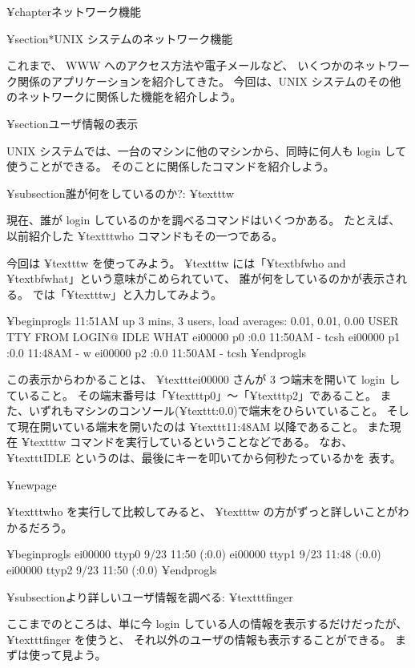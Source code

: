 ¥chapter{ネットワーク機能}

¥section*{UNIX システムのネットワーク機能}

これまで、 WWW へのアクセス方法や電子メールなど、
いくつかのネットワーク関係のアプリケーションを紹介してきた。
今回は、UNIX システムのその他のネットワークに関係した機能を紹介しよう。

¥section{ユーザ情報の表示}

 UNIX システムでは、一台のマシンに他のマシンから、同時に何人も login して
使うことができる。
そのことに関係したコマンドを紹介しよう。

¥subsection{誰が何をしているのか?: ¥texttt{w}}

現在、誰が login しているのかを調べるコマンドはいくつかある。
たとえば、以前紹介した ¥texttt{who} コマンドもその一つである。

今回は ¥texttt{w} を使ってみよう。
¥texttt{w} には「¥textbf{w}ho and ¥textbf{w}hat」という意味がこめられていて、
誰が何をしているのかが表示される。
では「¥texttt{w}」と入力してみよう。

¥begin{progls}
11:51AM  up 3 mins, 3 users, load averages: 0.01, 0.01, 0.00
USER             TTY      FROM              LOGIN@  IDLE WHAT
ei00000          p0       :0.0             11:50AM     - tcsh
ei00000          p1       :0.0             11:48AM     - w
ei00000          p2       :0.0             11:50AM     - tcsh
%
¥end{progls}

この表示からわかることは、 ¥texttt{ei00000} さんが 3 つ端末を開いて
login していること。
その端末番号は「¥texttt{p0}」〜「¥texttt{p2}」であること。
また、いずれもマシンのコンソール(¥texttt{:0.0})で端末をひらいていること。
そして現在開いている端末を開いたのは ¥texttt{11:48AM} 以降であること。
また現在 ¥texttt{w} コマンドを実行しているということなどである。
なお、 ¥texttt{IDLE} というのは、最後にキーを叩いてから何秒たっているかを
表す。

¥newpage

¥texttt{who} を実行して比較してみると、
¥texttt{w} の方がずっと詳しいことがわかるだろう。

¥begin{progls}
ei00000          ttyp0     9/23 11:50   (:0.0)
ei00000          ttyp1     9/23 11:48   (:0.0)
ei00000          ttyp2     9/23 11:50   (:0.0)
%
¥end{progls}

¥subsection{より詳しいユーザ情報を調べる: ¥texttt{finger}}

ここまでのところは、単に今 login している人の情報を表示するだけだったが、
¥texttt{finger} を使うと、
それ以外のユーザの情報も表示することができる。
まずは使って見よう。

